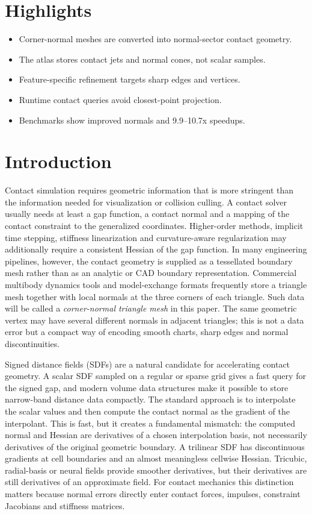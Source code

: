 \documentclass[preprint,12pt,sort&compress]{elsarticle}
\begin{document}
\section*{Highlights}
\begin{itemize}[leftmargin=1.5em]
\item Corner-normal meshes are converted into normal-sector contact geometry.
\item The atlas stores contact jets and normal cones, not scalar samples.
\item Feature-specific refinement targets sharp edges and vertices.
\item Runtime contact queries avoid closest-point projection.
\item Benchmarks show improved normals and 9.9--10.7x speedups.
\end{itemize}

\section{Introduction}
\label{sec:introduction}

Contact simulation requires geometric information that is more stringent than the information needed for visualization or collision culling. A contact solver usually needs at least a gap function, a contact normal and a mapping of the contact constraint to the generalized coordinates. Higher-order methods, implicit time stepping, stiffness linearization and curvature-aware regularization may additionally require a consistent Hessian of the gap function. In many engineering pipelines, however, the contact geometry is supplied as a tessellated boundary mesh rather than as an analytic or CAD boundary representation. Commercial multibody dynamics tools and model-exchange formats frequently store a triangle mesh together with local normals at the three corners of each triangle. Such data will be called a \emph{corner-normal triangle mesh} in this paper. The same geometric vertex may have several different normals in adjacent triangles; this is not a data error but a compact way of encoding smooth charts, sharp edges and normal discontinuities.

Signed distance fields (SDFs) are a natural candidate for accelerating contact geometry. A scalar SDF sampled on a regular or sparse grid gives a fast query for the signed gap, and modern volume data structures make it possible to store narrow-band distance data compactly. The standard approach is to interpolate the scalar values and then compute the contact normal as the gradient of the interpolant. This is fast, but it creates a fundamental mismatch: the computed normal and Hessian are derivatives of a chosen interpolation basis, not necessarily derivatives of the original geometric boundary. A trilinear SDF has discontinuous gradients at cell boundaries and an almost meaningless cellwise Hessian. Tricubic, radial-basis or neural fields provide smoother derivatives, but their derivatives are still derivatives of an approximate field. For contact mechanics this distinction matters because normal errors directly enter contact forces, impulses, constraint Jacobians and stiffness matrices.
\end{document}
